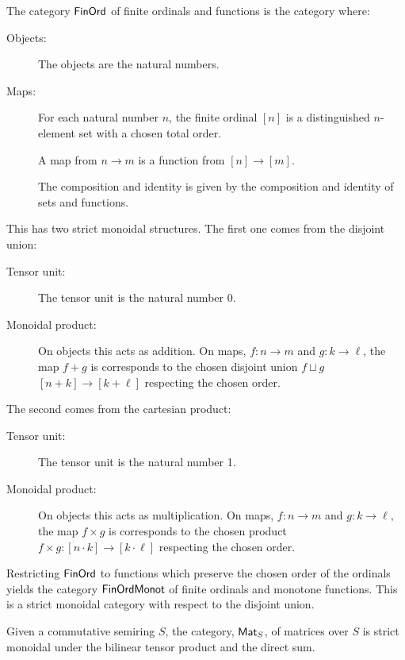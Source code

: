 \begin{example}

The category $\mathsf{FinOrd}$ of finite ordinals and functions is the category where:

\begin{description}
\item[Objects:] The objects are the natural numbers.

\item[Maps:]
For each natural number $n$, the finite ordinal $[n]$ is a distinguished $n$-element set with a chosen total order.


A map from $n\to m$ is a function from $[n]\to [m]$.

The composition and identity is given by the composition and identity of sets and functions.
\end{description}

This has two strict monoidal structures.  The first one comes from the disjoint union:

\begin{description}
\item[Tensor unit:] The tensor unit is the natural number 0.
\item[Monoidal product:]
On objects this acts as addition.  On maps, $f:n\to m$ and $g:k\to \ell$, the map $f+g$ is corresponds to the chosen disjoint union $f\sqcup g$ $[n+k]\to [k+\ell]$ respecting the chosen order.
\end{description}

The second comes from the cartesian product:

\begin{description}
\item[Tensor unit:] The tensor unit is the natural number 1.
\item[Monoidal product:]
On objects this acts as multiplication.  On maps, $f:n\to m$ and $g:k\to \ell$, the map $f\times g$ is corresponds to the chosen product $f\times g:[n\cdot k]\to [k\cdot \ell]$ respecting the chosen order.
\end{description}


Restricting $\mathsf{FinOrd}$ to functions which preserve the chosen order of the ordinals yields the category $\mathsf{FinOrdMonot}$ of finite ordinals and monotone functions.  This is a strict monoidal category with respect to the disjoint union.
\end{example}

\begin{example}
Given a commutative semiring $S$, the category, $\mathsf{Mat}_S$, of matrices over $S$ is strict monoidal under the bilinear tensor product and the direct sum.
\end{example}






